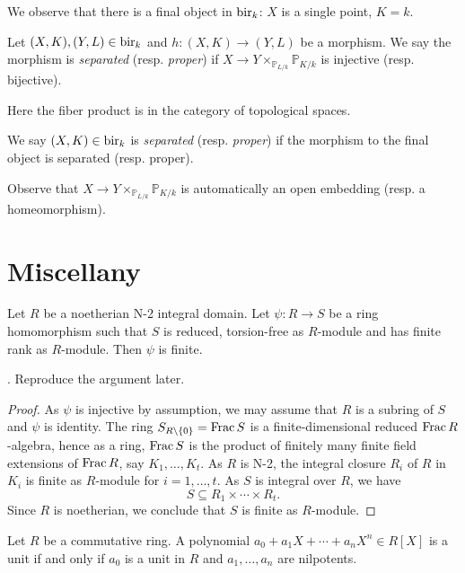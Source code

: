 We observe that there is a final object in $\mathrm{bir}_k$: $X$ is a single point, $K=k$. 

\begin{definition}
    Let $(X,K),(Y,L)\in \mathrm{bir}_k$ and $h:(X,K)\rightarrow(Y,L)$ be a morphism. We say the morphism is \emph{separated} (resp. \emph{proper}) if $X\rightarrow Y\times_{\mathbb{P}_{L/k}}\mathbb{P}_{K/k}$ is injective (resp. bijective).

    Here the fiber product is in the category of topological spaces.

    We say $(X,K)\in \mathrm{bir}_k$ is \emph{separated} (resp. \emph{proper}) if the morphism to the final object is separated (resp. proper).
\end{definition}
Observe that $X\rightarrow Y\times_{\mathbb{P}_{L/k}}\mathbb{P}_{K/k}$ is automatically an open embedding (resp. a homeomorphism).



\section{Miscellany}

\begin{proposition}\label{prop-noethjapfinite}
    Let $R$ be a noetherian N-2 integral domain. Let $\psi:R\rightarrow S$ be a ring homomorphism such that $S$ is reduced, torsion-free as $R$-module and has finite rank as $R$-module. Then $\psi$ is finite.
\end{proposition}
\cite[Page~122]{BGR}. Reproduce the argument later.
\begin{proof}
    As $\psi$ is injective by assumption, we may assume that $R$ is a subring of $S$ and $\psi$ is identity. The ring $S_{R\setminus\{0\}}=\operatorname{Frac} S$ is a finite-dimensional reduced $\operatorname{Frac} R$-algebra, hence as a ring, $\operatorname{Frac} S$ is the product of finitely many finite field extensions of $\operatorname{Frac} R$, say $K_1,\ldots,K_t$.  As $R$ is N-2, the integral closure $R_i$ of $R$ in $K_i$ is finite as $R$-module for $i=1,\ldots,t$. As $S$ is integral over $R$, we have
    \[
        S\subseteq R_1\times \cdots \times R_t.  
    \]
    Since $R$ is noetherian, we conclude that $S$ is finite as $R$-module.
\end{proof}

\begin{lemma}
    Let $R$ be a commutative ring. A polynomial $a_0+a_1X+\cdots+a_nX^n\in R[X]$ is a unit if and only if $a_0$ is a unit in $R$ and $a_1,\ldots,a_n$ are nilpotents.
\end{lemma}



